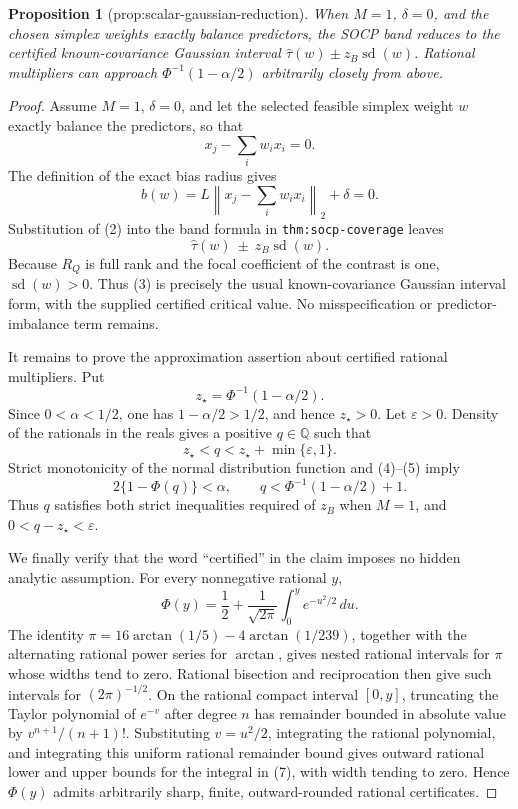 \documentclass{article}
\newtheorem{proposition}{Proposition}
\begin{document}
\begin{proposition}[prop:scalar-gaussian-reduction]\label{prop:scalar-gaussian-reduction}
When \(M=1\), \(\delta=0\), and the chosen simplex weights exactly balance predictors, the SOCP band reduces to the certified known-covariance Gaussian interval \(\widehat\tau(w)\pm z_B\operatorname{sd}(w)\). Rational multipliers can approach \(\Phi^{-1}(1-\alpha/2)\) arbitrarily closely from above.
\end{proposition}
\begin{proof}
Assume \(M=1\), \(\delta=0\), and let the selected feasible simplex weight
\(w\) exactly balance the predictors, so that
\[
 x_j-\sum_iw_ix_i=0.
 \tag{1}
\]
The definition of the exact bias radius gives
\[
 b(w)=L\left\lVert x_j-\sum_iw_ix_i\right\rVert_2+\delta=0.
 \tag{2}
\]
Substitution of (2) into the band formula in
\texttt{thm:socp-coverage} leaves
\[
 \widehat\tau(w)\ \pm\ z_B\operatorname{sd}(w).
 \tag{3}
\]
Because \(R_Q\) is full rank and the focal coefficient of the contrast is
one, \(\operatorname{sd}(w)>0\).  Thus (3) is precisely the usual
known-covariance Gaussian interval form, with the supplied certified
critical value.  No misspecification or predictor-imbalance term remains.

It remains to prove the approximation assertion about certified rational
multipliers.  Put
\[
 z_\star=\Phi^{-1}(1-\alpha/2).
 \tag{4}
\]
Since \(0<\alpha<1/2\), one has \(1-\alpha/2>1/2\), and hence
\(z_\star>0\).  Let \(\varepsilon>0\).  Density of the rationals in the
reals gives a positive \(q\in\mathbb Q\) such that
\[
 z_\star<q<z_\star+\min\{\varepsilon,1\}.
 \tag{5}
\]
Strict monotonicity of the normal distribution function and (4)--(5) imply
\[
 2\{1-\Phi(q)\}<\alpha,
 \qquad
 q<\Phi^{-1}(1-\alpha/2)+1.
 \tag{6}
\]
Thus \(q\) satisfies both strict inequalities required of \(z_B\) when
\(M=1\), and \(0<q-z_\star<\varepsilon\).

We finally verify that the word ``certified'' in the claim imposes no hidden
analytic assumption.  For every nonnegative rational \(y\),
\[
 \Phi(y)=\frac12+\frac1{\sqrt{2\pi}}
             \int_0^y e^{-u^2/2}\,du.
 \tag{7}
\]
The identity
\(\pi=16\arctan(1/5)-4\arctan(1/239)\), together with the alternating
rational power series for \(\arctan\), gives nested rational intervals for
\(\pi\) whose widths tend to zero.  Rational bisection and reciprocation then
give such intervals for \((2\pi)^{-1/2}\).  On the rational compact interval
\([0,y]\), truncating the Taylor polynomial of \(e^{-v}\) after degree
\(n\) has remainder bounded in absolute value by
\(v^{n+1}/(n+1)!\).  Substituting \(v=u^2/2\), integrating the rational
polynomial, and integrating this uniform rational remainder bound gives
outward rational lower and upper bounds for the integral in (7), with width
tending to zero.  Hence \(\Phi(y)\) admits arbitrarily sharp, finite,
outward-rounded rational certificates.


\end{proof}
\end{document}
